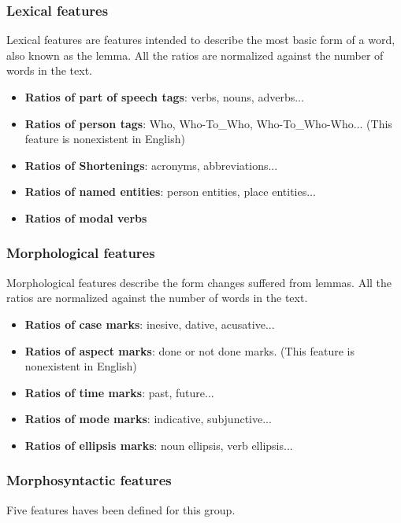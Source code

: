 \documentclass{acm_proc_article-sp}
\begin{document}
\subsubsection{Lexical features}
Lexical features are features intended to describe the most basic form of a word, also known as the lemma. All the ratios are normalized against the number of words in the text.
\begin{itemize}
\item {\bf Ratios of part of speech tags}: verbs, nouns, adverbs...

\item {\bf Ratios of person tags}: Who, Who-To\_Who, Who-To\_Who-Who... (This feature is nonexistent in English)

\item {\bf Ratios of Shortenings}: acronyms, abbreviations...

\item {\bf Ratios of named entities}: person entities, place entities...

\item {\bf Ratios of modal verbs}


\end{itemize}


\subsubsection{Morphological features}
Morphological features describe the form changes suffered from lemmas. All the ratios are normalized against the number of words in the text.
\begin{itemize}
\item {\bf Ratios of case marks}: inesive, dative, acusative...


\item {\bf Ratios of aspect marks}: done or not done marks. (This feature is nonexistent in English)

\item {\bf Ratios of time marks}: past, future...
\item {\bf Ratios of mode marks}: indicative, subjunctive...

\item {\bf Ratios of ellipsis marks}: noun ellipsis, verb ellipsis...
\end{itemize}


\subsubsection{Morphosyntactic features}
Five features haves been defined for this group.
\end{document}
